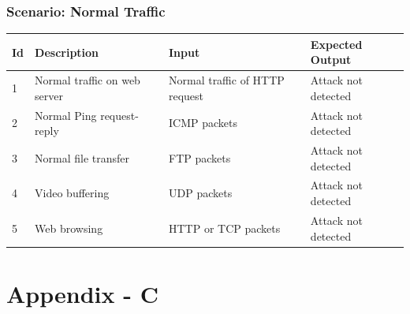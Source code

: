 \documentclass[12pt,a4paper,final]{report}
\DeclareRobustCommand{\gobblefive}[5]{}
\newcommand*{\SkipTocEntry}{\addtocontents{toc}{\gobblefive}}
\begin{document}
\SkipTocEntry\subsection{Scenario: Normal Traffic}
\begin{center}
\begin{tabular}{|p{1cm}|p{3cm}|p{3cm}|p{3.5cm}|}
\hline 
 \textbf{Id} & \textbf{Description} & \textbf{Input} & \textbf{Expected Output} \\ 
\hline 
 1 & Normal traffic on web server & Normal traffic of HTTP request & Attack not detected\\
 \hline
 2 & Normal Ping request-reply & ICMP packets & Attack not detected\\ 
 \hline
 3 & Normal file transfer & FTP packets & Attack not detected\\
 \hline
 4 & Video buffering & UDP packets & Attack not detected\\
 \hline
 5 & Web browsing & HTTP or TCP packets & Attack not detected\\
\hline 
\end{tabular} 
\end{center}
\newpage

\SkipTocEntry\chapter{Appendix - C}
\thispagestyle{empty}
\newpage
\end{document}
